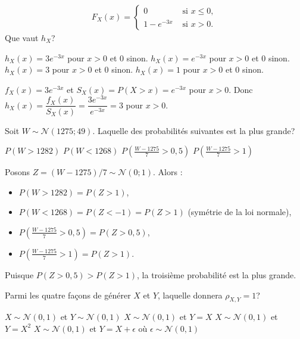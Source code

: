 \begin{questions}
\begin{align*}
    F_X(x) = \left\{
			\begin{array}{ll}
			0  & \mbox{ si } x\leq 0, \\
			1-e^{-3x} & \mbox{ si } x> 0.
			\end{array}
			\right. 
\end{align*}
Que vaut $h_X$?

\begin{checkboxes}
    \choice $h_X(x)=3e^{-3x}$ pour $x> 0$ et $0$ sinon.
    \choice $h_X(x)=e^{-3x}$ pour $x> 0$ et $0$ sinon.
    \correctchoice $h_X(x)=3$ pour $x> 0$ et $0$ sinon.
    \choice $h_X(x)=1$ pour $x>0$ et $0$ sinon.
\end{checkboxes}

\begin{solution}
$f_X(x)=3e^{-3x}$ et $S_X(x)=P(X>x)=e^{-3x}$ pour $x>0$. Donc $h_X(x)=\dfrac{f_X(x)}{S_X(x)}=\dfrac{3e^{-3x}}{e^{-3x}}=3$ pour $x>0$.
\end{solution}

\vspace{0.3cm}
\question[3] Soit $W\sim\mathcal{N}(1275; 49)$. Laquelle des probabilités suivantes est la plus grande?

\begin{checkboxes}
    \choice $P(W>1282)$
    \choice $P(W<1268)$
    \correctchoice $\displaystyle P\left(\frac{W-1275}{7}>0,5\right)$
    \choice $\displaystyle P\left(\frac{W-1275}{7}>1\right)$
\end{checkboxes}

\begin{solution}
Posons $Z=(W-1275)/7\sim\mathcal{N}(0;1)$. Alors :
\begin{itemize}
  \item $P(W>1282)=P(Z>1)$,
  \item $P(W<1268)=P(Z<-1)=P(Z>1)$ (symétrie de la loi normale),
  \item $P\!\left(\frac{W-1275}{7}>0{,}5\right)=P(Z>0{,}5)$,
  \item $P\!\left(\frac{W-1275}{7}>1\right)=P(Z>1)$.
\end{itemize}
Puisque $P(Z>0{,}5)>P(Z>1)$, la troisième probabilité est la plus grande.
\end{solution}

\vspace{0.3cm}
\question[3] Parmi les quatre façons de générer $X$ et $Y$, laquelle donnera $\rho_{X,Y}=1$?

\begin{checkboxes}
    \choice $X\sim\mathcal{N}(0,1)$ et $Y\sim\mathcal{N}(0,1)$
    \correctchoice $X\sim\mathcal{N}(0,1)$ et $Y=X$
    \choice $X\sim\mathcal{N}(0,1)$ et $Y=X^2$
    \choice $X\sim\mathcal{N}(0,1)$ et $Y=X+\epsilon$ où $\epsilon\sim\mathcal{N}(0,1)$
\end{checkboxes}


\end{questions}
